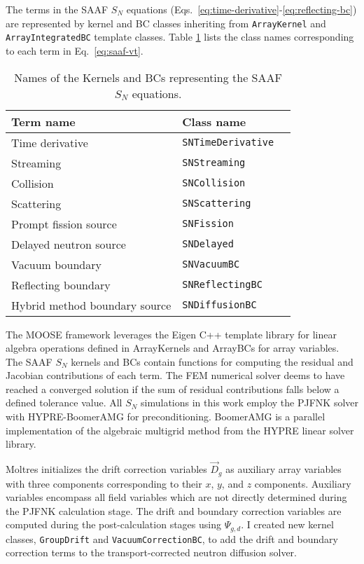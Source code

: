 The terms in the \gls{SAAF} $S_N$ equations (Eqs.\ \ref{eq:time-derivative}-\ref{eq:reflecting-bc})
are represented by kernel and BC classes inheriting from \texttt{ArrayKernel} and
\texttt{ArrayIntegratedBC} template classes. Table \ref{tab:saaf-sn} lists the class names
corresponding to each term in Eq.\ \ref{eq:saaf-vt}.
%
\begin{table}[htb]
  \centering
  \caption{Names of the Kernels and BCs representing the \gls{SAAF} $S_N$ equations.}
  \begin{tabular}{l l l}
    \toprule
    Term name & Class name \\
    \midrule
    Time derivative & \texttt{SNTimeDerivative} \\
    Streaming & \texttt{SNStreaming} \\
    Collision & \texttt{SNCollision} \\
    Scattering & \texttt{SNScattering} \\
    Prompt fission source & \texttt{SNFission} \\
    Delayed neutron source & \texttt{SNDelayed} \\
    Vacuum boundary & \texttt{SNVacuumBC} \\
    Reflecting boundary & \texttt{SNReflectingBC} \\
    Hybrid method boundary source & \texttt{SNDiffusionBC} \\
    \bottomrule
  \end{tabular}
  \label{tab:saaf-sn}
\end{table}

The \gls{MOOSE} framework leverages the Eigen \cite{guennebaud_eigen_2010} C++ template library for
linear algebra operations defined in ArrayKernels and ArrayBCs for array variables. The \gls{SAAF}
$S_N$ kernels and BCs contain functions for computing the residual and Jacobian contributions of
each term. The \gls{FEM} numerical solver deems to have reached a converged solution if the sum of
residual contributions falls below a defined tolerance value. All $S_N$ simulations in this work
employ the \gls{PJFNK} solver \cite{knoll_jacobian-free_2004} with HYPRE-BoomerAMG
\cite{hypre_hypre_2022} for preconditioning. BoomerAMG is a parallel implementation of the
algebraic multigrid method from the HYPRE linear solver library.

Moltres initializes the drift correction variables $\vec{D}_g$ as auxiliary array variables
with three components corresponding to their $x$, $y$, and $z$ components. Auxiliary variables
encompass all field variables which are not directly determined during the \gls{PJFNK}
calculation stage. The drift and boundary correction variables are computed during the
post-calculation stages using $\Psi_{g,d}$.
I created new kernel classes, \texttt{GroupDrift} and \texttt{VacuumCorrectionBC}, to add the
drift and boundary correction terms to the transport-corrected neutron diffusion solver.

